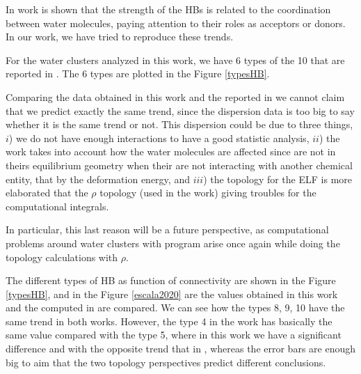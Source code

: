 In \citet{Castor2020} work is shown that the strength of the HBs is related to
the coordination between water molecules, paying attention to their roles as
acceptors or donors. In our work, we have tried to reproduce these trends.

For the water clusters analyzed in this work, we have 6 types of the 10 that
are reported in . The 6 types are plotted in the Figure
\ref{typesHB}.

Comparing the data obtained in this work and the reported in
 we cannot claim that we predict exactly the same trend,
since the dispersion data is too big to say whether it is the same trend or
not. This dispersion could be due to three things, $i$) we do not have enough
interactions to have a good statistic analysis, $ii$) the 
work takes into account how the water molecules are affected since are not in
theirs equilibrium geometry when their are not interacting with another
chemical entity, that by the deformation energy, and $iii$) the topology for
the ELF is more elaborated that the $\rho$ topology (used in the
 work) giving troubles for the computational integrals.

In particular, this last reason will be a future perspective, as computational
problems around water clusters with {} program arise once again
while doing the topology calculations with $\rho$.

\newpage

The different types of HB as function of connectivity are shown in the Figure
\ref{typesHB}, and in the Figure \ref{escala2020} are the values obtained in
this work and the computed in  are compared.  We can see
how the types 8, 9, 10 have the same trend in both works. However, the type 4
in the work  has basically the same value compared with the
type 5, where in this work we have a significant difference and with the
opposite trend that in , whereas the error bars are enough
big to aim that the two topology perspectives predict different conclusions.

